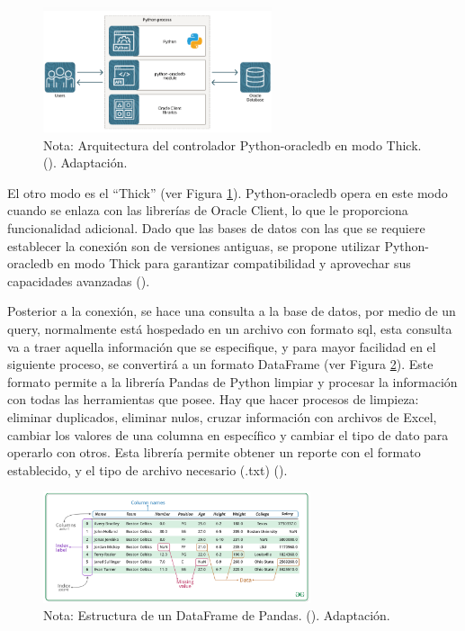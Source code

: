 \documentclass[letter,oneside,12pt,spanish]{report}
\begin{document}
\begin{figure}[ht]
    \centering
    \includegraphics[width=0.6\textwidth]{Figs/modo thick.png}
    \label{fig:modothick}
    \\Nota:  Arquitectura del controlador Python-oracledb en modo Thick. (\cite{oracle2024python}). Adaptación.
\end{figure}



\noindent El otro modo es el “Thick” (ver Figura \ref{fig:modothick}). Python-oracledb opera en este modo cuando se enlaza con las librerías de Oracle Client, lo que le proporciona funcionalidad adicional. Dado que las bases de datos con las que se requiere establecer la conexión son de versiones antiguas, se propone utilizar Python-oracledb en modo Thick para garantizar compatibilidad y aprovechar sus capacidades avanzadas (\cite{oracle2024python}).


\noindent Posterior a la conexión, se hace una consulta a la base de datos, por medio de un query, normalmente está hospedado en un archivo con formato sql, esta consulta va a traer aquella información que se especifique, y para mayor facilidad en el siguiente proceso, se convertirá a un formato DataFrame (ver Figura \ref{fig:pandas}). Este formato permite a la librería Pandas de Python limpiar y procesar la información con todas las herramientas que posee. Hay que hacer procesos de limpieza: eliminar duplicados, eliminar nulos, cruzar información con archivos de Excel, cambiar los valores de una columna en específico y cambiar el tipo de dato para operarlo con otros. Esta librería permite obtener un reporte con el formato establecido, y el tipo de archivo necesario (.txt) (\cite{pandas2024}).

\begin{figure}[ht]
    \centering
    \includegraphics[width=0.7\textwidth]{Figs/pandas.png}
    \label{fig:pandas}
    \\Nota:  Estructura de un DataFrame de Pandas. (\cite{pandas2024}). Adaptación.
\end{figure}
\end{document}
